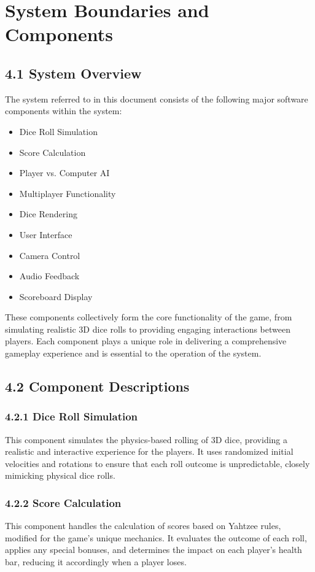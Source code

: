 \documentclass{article}
\begin{document}
\section{System Boundaries and Components}

\subsection*{4.1 System Overview}

The system referred to in this document consists of the following major software components within the system:

\begin{itemize}
    \item Dice Roll Simulation
    \item Score Calculation
    \item Player vs. Computer AI
    \item Multiplayer Functionality
    \item Dice Rendering
    \item User Interface
    \item Camera Control
    \item Audio Feedback
    \item Scoreboard Display
\end{itemize}

These components collectively form the core functionality of the game, from simulating realistic 3D dice rolls to providing engaging interactions between players. Each component plays a unique role in delivering a comprehensive gameplay experience and is essential to the operation of the system.

\subsection*{4.2 Component Descriptions}

\subsubsection*{4.2.1 Dice Roll Simulation}
This component simulates the physics-based rolling of 3D dice, providing a realistic and interactive experience for the players. It uses randomized initial velocities and rotations to ensure that each roll outcome is unpredictable, closely mimicking physical dice rolls.

\subsubsection*{4.2.2 Score Calculation}
This component handles the calculation of scores based on Yahtzee rules, modified for the game's unique mechanics. It evaluates the outcome of each roll, applies any special bonuses, and determines the impact on each player's health bar, reducing it accordingly when a player loses.
\end{document}
